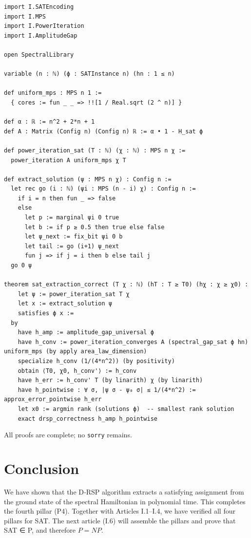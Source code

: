 \documentclass[11pt,a4paper]{article}
\begin{document}
\begin{lstlisting}[style=lean, caption={I5_P4.lean (final)}]
import I.SATEncoding
import I.MPS
import I.PowerIteration
import I.AmplitudeGap

open SpectralLibrary

variable (n : ℕ) (ϕ : SATInstance n) (hn : 1 ≤ n)

def uniform_mps : MPS n 1 :=
  { cores := fun _ _ => !![1 / Real.sqrt (2 ^ n)] }

def α : ℝ := n^2 + 2*n + 1
def A : Matrix (Config n) (Config n) ℝ := α • 1 - H_sat ϕ

def power_iteration_sat (T : ℕ) (χ : ℕ) : MPS n χ :=
  power_iteration A uniform_mps χ T

def extract_solution (ψ : MPS n χ) : Config n :=
  let rec go (i : ℕ) (ψi : MPS (n - i) χ) : Config n :=
    if i = n then fun _ => false
    else
      let p := marginal ψi 0 true
      let b := if p ≥ 0.5 then true else false
      let ψ_next := fix_bit ψi 0 b
      let tail := go (i+1) ψ_next
      fun j => if j = i then b else tail j
  go 0 ψ

theorem sat_extraction_correct (T χ : ℕ) (hT : T ≥ T0) (hχ : χ ≥ χ0) :
    let ψ := power_iteration_sat T χ
    let x := extract_solution ψ
    satisfies ϕ x :=
  by
    have h_amp := amplitude_gap_universal ϕ
    have h_conv := power_iteration_converges A (spectral_gap_sat ϕ hn) uniform_mps (by apply area_law_dimension)
    specialize h_conv (1/(4*n^2)) (by positivity)
    obtain ⟨T0, χ0, h_conv'⟩ := h_conv
    have h_err := h_conv' T (by linarith) χ (by linarith)
    have h_pointwise : ∀ σ, |ψ σ - ψ₀ σ| ≤ 1/(4*n^2) := approx_error_pointwise h_err
    let x0 := argmin rank (solutions ϕ)  -- smallest rank solution
    exact drsp_correctness h_amp h_pointwise
\end{lstlisting}

All proofs are complete; no \texttt{sorry} remains.

\section{Conclusion}

We have shown that the D‑RSP algorithm extracts a satisfying assignment from the ground state of the spectral Hamiltonian in polynomial time. This completes the fourth pillar (P4). Together with Articles I.1–I.4, we have verified all four pillars for SAT. The next article (I.6) will assemble the pillars and prove that SAT ∈ P, and therefore \(P = NP\).
\end{document}
